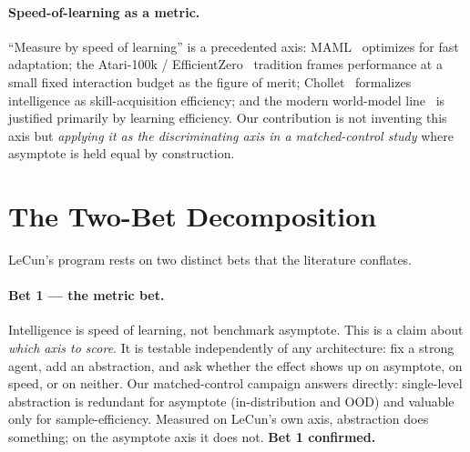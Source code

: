 \documentclass{article}
\begin{document}
\paragraph{Speed-of-learning as a metric.}
``Measure by speed of learning'' is a precedented axis:
MAML~\citep{finn2017maml} optimizes for fast adaptation; the Atari-100k /
EfficientZero~\citep{ye2021efficientzero} tradition frames performance at a small
fixed interaction budget as the figure of merit; Chollet~\citep{chollet2019measure}
formalizes intelligence as skill-acquisition efficiency; and the modern world-model
line~\citep{ha2018worldmodels} is justified primarily by learning efficiency. Our
contribution is not inventing this axis but \emph{applying it as the
discriminating axis in a matched-control study} where asymptote is held equal by
construction.

\section{The Two-Bet Decomposition}
\label{sec:twobet}

LeCun's program rests on two distinct bets that the literature conflates.

\paragraph{Bet 1 --- the metric bet.}
Intelligence is speed of learning, not benchmark asymptote. This is a claim about
\emph{which axis to score}. It is testable independently of any architecture: fix
a strong agent, add an abstraction, and ask whether the effect shows up on
asymptote, on speed, or on neither. Our matched-control campaign answers
directly: single-level abstraction is redundant for asymptote (in-distribution
and OOD) and valuable only for sample-efficiency. Measured on LeCun's own axis,
abstraction does something; on the asymptote axis it does not. \textbf{Bet 1
confirmed.}
\end{document}
